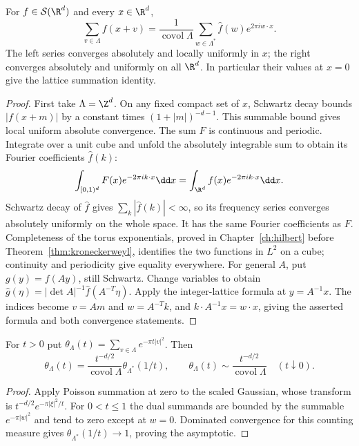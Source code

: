 \begin{theorem}\label{thm:poissonlattice}
For $f\in\mathcal S(\R^d)$ and every $x\in\R^d$,
\[
\sum_{v\in\Lambda}f(x+v)
=\frac1{\operatorname{covol}\Lambda}
\sum_{w\in\Lambda^*}\hat f(w)e^{2\pi iw\cdot x}.
\]
The left series converges absolutely and locally uniformly in $x$; the right converges absolutely and uniformly on all $\R^d$. In particular their values at $x=0$ give the lattice summation identity.
\end{theorem}
\begin{proof}
First take $\Lambda=\Z^d$. On any fixed compact set of $x$, Schwartz decay bounds $|f(x+m)|$ by a constant times $(1+|m|)^{-d-1}$. This summable bound gives local uniform absolute convergence. The sum $F$ is continuous and periodic. Integrate over a unit cube and unfold the absolutely integrable sum to obtain its Fourier coefficients $\hat f(k)$:
\[
\int_{[0,1)^d}F(x)e^{-2\pi ik\cdot x}\dd x
=\int_{\R^d}f(x)e^{-2\pi ik\cdot x}\dd x.
\]
Schwartz decay of $\hat f$ gives $\sum_k|\hat f(k)|<\infty$, so its frequency series converges absolutely uniformly on the whole space. It has the same Fourier coefficients as $F$. Completeness of the torus exponentials, proved in Chapter~\ref{ch:hilbert} before Theorem~\ref{thm:kroneckerweyl}, identifies the two functions in $L^2$ on a cube; continuity and periodicity give equality everywhere.
For general $A$, put $g(y)=f(Ay)$, still Schwartz. Change variables to obtain $\hat g(\eta)=|\det A|^{-1}\hat f(A^{-T}\eta)$. Apply the integer-lattice formula at $y=A^{-1}x$. The indices become $v=Am$ and $w=A^{-T}k$, and $k\cdot A^{-1}x=w\cdot x$, giving the asserted formula and both convergence statements.
\end{proof}

\begin{corollary}\label{cor:thetalattice}
For $t>0$ put $\theta_\Lambda(t)=\sum_{v\in\Lambda}e^{-\pi t|v|^2}$. Then
\[
\theta_\Lambda(t)=\frac{t^{-d/2}}{\operatorname{covol}\Lambda}
\theta_{\Lambda^*}(1/t),
\qquad
\theta_\Lambda(t)\sim\frac{t^{-d/2}}{\operatorname{covol}\Lambda}\quad(t\downarrow0).
\]
\end{corollary}
\begin{proof}
Apply Poisson summation at zero to the scaled Gaussian, whose transform is $t^{-d/2}e^{-\pi|\xi|^2/t}$. For $0<t\le1$ the dual summands are bounded by the summable $e^{-\pi|w|^2}$ and tend to zero except at $w=0$. Dominated convergence for this counting measure gives $\theta_{\Lambda^*}(1/t)\to1$, proving the asymptotic.
\end{proof}

